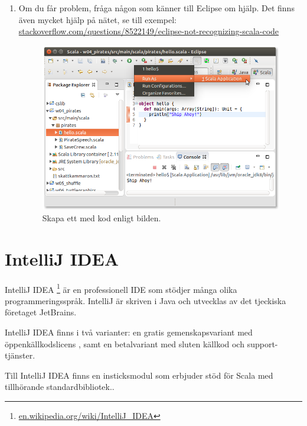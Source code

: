 \begin{enumerate}
\item Om du får problem, fråga någon som känner till Eclipse om hjälp. Det finns även mycket hjälp på nätet, se till exempel: \\ \href{http://stackoverflow.com/questions/8522149/eclipse-not-recognizing-scala-code}{stackoverflow.com/questions/8522149/eclipse-not-recognizing-scala-code}

\begin{figure}[H]
\centering
\includegraphics[width=1.0\textwidth]{../img/eclipse/eclipse-pirates-hello.png} 
\caption {Skapa ett  med kod enligt bilden.}
\label{fig:eclipse:pirates-hi}
\end{figure}


\end{enumerate}



\newpage

\section{IntelliJ IDEA}\label{appendix:ide:intellij}

IntelliJ IDEA%
\footnote{\href{https://en.wikipedia.org/wiki/IntelliJ_IDEA}{en.wikipedia.org/wiki/IntelliJ\_IDEA}}
 är en professionell IDE som stödjer många olika programmeringsspråk. IntelliJ är skriven i Java och utvecklas av det tjeckiska företaget JetBrains. 

IntelliJ IDEA finns i två varianter: en gratis gemenskapsvariant med öppenkällkodslicens , samt en betalvariant med sluten källkod och support-tjänster.


Till IntelliJ IDEA finns en insticksmodul  som erbjuder stöd för Scala med tillhörande standardbibliotek..

